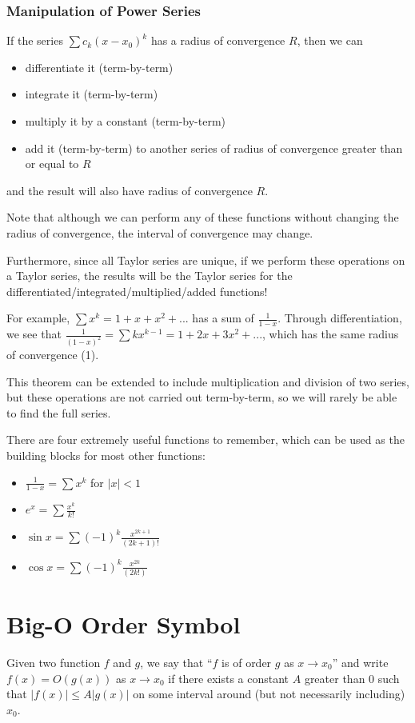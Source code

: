 \documentclass[12pt]{article}
\begin{document}
\subsubsection*{Manipulation of Power Series}
If the series $\sum c_k (x-x_0)^k$ has a radius of convergence $R$, then we can
\begin{itemize}
\item differentiate it (term-by-term)
\item integrate it (term-by-term)
\item multiply it by a constant (term-by-term)
\item add it (term-by-term) to another series of radius of convergence greater than or equal to $R$
\end{itemize}
and the result will also have radius of convergence $R$.

Note that although we can perform any of these functions without changing the radius of convergence, the interval of convergence may change.

Furthermore, since all Taylor series are unique, if we perform these operations on a Taylor series, the results will be the Taylor series for the differentiated/integrated/multiplied/added functions!

For example, $\sum x^k = 1 + x + x^2 + ...$ has a sum of $\frac{1}{1-x}$. Through differentiation, we see that $\frac{1}{(1-x)^2} = \sum kx^{k-1} = 1 + 2x + 3x^2 + ...$, which has the same radius of convergence (1).

This theorem can be extended to include multiplication and division of two series, but these operations are not carried out term-by-term, so we will rarely be able to find the full series.

There are four extremely useful functions to remember, which can be used as the building blocks for most other functions:
\begin{itemize}
\item $\frac{1}{1-x} = \sum x^k$ for $|x| < 1$
\item $e^x = \sum \frac{x^k}{k!}$
\item $\sin x = \sum (-1)^k \frac{x^{2k+1}}{(2k+1)!}$
\item $\cos x = \sum (-1)^k \frac{x^{2k}}{(2k!)}$
\end{itemize}

\section*{Big-O Order Symbol}
 Given two function $f$ and $g$, we say that ``$f$ is of order $g$ as $x \to x_0$'' and write $f(x) = O(g(x))$ as $x \to x_0$ if there exists a constant $A$ greater than 0 such that $|f(x)| \leq A |g(x)|$ on some interval around (but not necessarily including) $x_0$.
\end{document}
